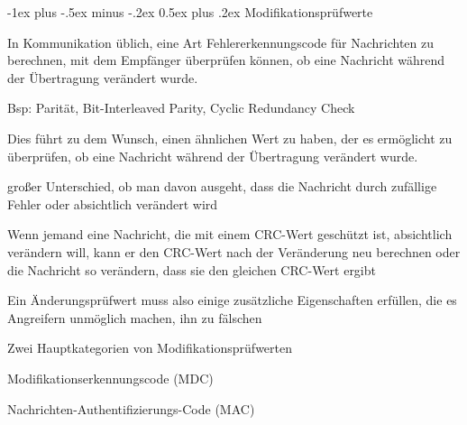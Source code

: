 \documentclass[a4paper]{article}
\makeatletter
\renewcommand{\section}{\@startsection{section}{1}{0mm}%
 {-1ex plus -.5ex minus -.2ex}%
 {0.5ex plus .2ex}%
 {\normalfont\large\bfseries}}
\makeatother
\begin{document}
\begin{multicols}{3}
      \section{Modifikationsprüfwerte}
      \begin{itemize*}
            \item In Kommunikation üblich, eine Art Fehlererkennungscode für Nachrichten zu berechnen, mit dem Empfänger überprüfen können, ob eine Nachricht während der Übertragung verändert wurde.
            \item Bsp: Parität, Bit-Interleaved Parity, Cyclic Redundancy Check
            \item Dies führt zu dem Wunsch, einen ähnlichen Wert zu haben, der es ermöglicht zu überprüfen, ob eine Nachricht während der Übertragung verändert wurde.
            \item großer Unterschied, ob man davon ausgeht, dass die Nachricht durch zufällige Fehler oder absichtlich verändert wird
            \item Wenn jemand eine Nachricht, die mit einem CRC-Wert geschützt ist, absichtlich verändern will, kann er den CRC-Wert nach der Veränderung neu berechnen oder die Nachricht so verändern, dass sie den gleichen CRC-Wert ergibt
            \item Ein Änderungsprüfwert muss also einige zusätzliche Eigenschaften erfüllen, die es Angreifern unmöglich machen, ihn zu fälschen
            \item Zwei Hauptkategorien von Modifikationsprüfwerten
            \begin{itemize*}
                  \item Modifikationserkennungscode (MDC)
                  \item Nachrichten-Authentifizierungs-Code (MAC)
            \end{itemize*}
      \end{itemize*}


\end{multicols}
\end{document}

